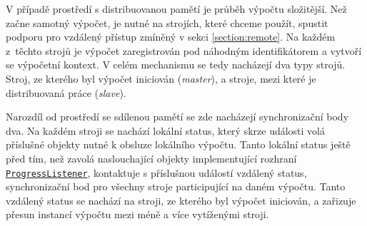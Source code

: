 V případě prostředí s distribuovanou pamětí je průběh výpočtu slo\-ži\-těj\-ší. Než začne samotný výpočet,
je nutné na strojích, které chceme použít, spustit podporu pro vzdálený přístup
zmíněný v sekci \ref{section:remote}. Na každém z~těch\-to strojů je výpočet zaregistrován
pod náhodným identifikátorem a vytvoří se výpočetní kontext. V celém mechanismu se tedy  nacházejí dva typy strojů.
Stroj, ze kterého byl výpočet iniciován (\textit{master}), a stroje, mezi které je distribuovaná práce (\textit{slave}).

Narozdíl od prostředí se sdílenou pamětí se zde nacházejí syn\-chro\-ni\-zač\-ní body dva.
Na každém stroji se nachází lokální status, který skrze události volá příslušné objekty
nutné k obsluze lokálního výpočtu. Tanto lokální status ještě před tím, než zavolá naslouchající objekty implementující rozhraní 
\href{https://github.com/sybila/parasim/blob/master/extensions/computation-lifecycle-api/src/main/java/org/sybila/parasim/computation/lifecycle/api/ProgressListener.java}{\texttt{ProgressListener}},
kontaktuje s příslušnou událostí vzdálený status, synchronizační bod pro všechny stroje participující na da\-ném vý\-poč\-tu.
Tanto vzdálený status se nachází na stroji, ze kterého byl výpočet iniciován, a zařizuje přesun
instancí výpočtu mezi méně a více vytíženými stroji.

